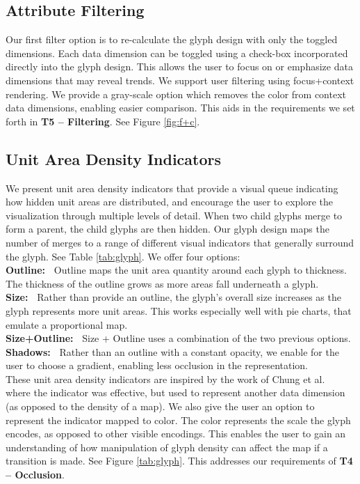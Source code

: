 \subsection{Attribute Filtering} \label{sec:filter}
Our first filter option is to re-calculate the glyph design with only the toggled dimensions. Each data dimension can be toggled using a check-box incorporated directly into the glyph design. This allows the user to focus on or emphasize data dimensions that may reveal trends. We support user filtering using focus+context rendering. We provide a gray-scale option which removes the color from context data dimensions, enabling easier comparison. This aids in the requirements we set forth in \textbf{T5 -- Filtering}. See Figure \ref{fig:f+c}.

\subsection{Unit Area Density Indicators}
We present unit area density indicators that provide a visual queue indicating how hidden unit areas are distributed, and encourage the user to explore the visualization through multiple levels of detail. When two child glyphs merge to form a parent, the child glyphs are then hidden. Our glyph design maps the number of merges to a range of different visual indicators that generally surround the glyph. See Table \ref{tab:glyph}. We offer four options:\\
\textbf{Outline:~} Outline maps the unit area quantity around each glyph to thickness. The thickness of the outline grows as more areas fall underneath a glyph.\\
\textbf{Size:~} Rather than provide an outline, the glyph's overall size increases as the glyph represents more unit areas. This works especially well with pie charts, that emulate a proportional map. \\
\textbf{Size+Outline:~} Size + Outline uses a combination of the two previous options.\\
\textbf{Shadows:~} Rather than an outline with a constant opacity, we enable for the user to choose a gradient, enabling less occlusion in the representation.\\
These unit area density indicators are inspired by the work of Chung et al.\ \cite{chung2015glyph} where the indicator was effective, but used to represent another data dimension (as opposed to the density of a map).
We also give the user an option to represent the indicator mapped to color. The color represents the scale the glyph encodes, as opposed to other visible encodings. This enables the user to gain an understanding of how manipulation of glyph density can affect the map if a transition is made. See Figure \ref{tab:glyph}. This addresses our requirements of \textbf{T4 -- Occlusion}.

